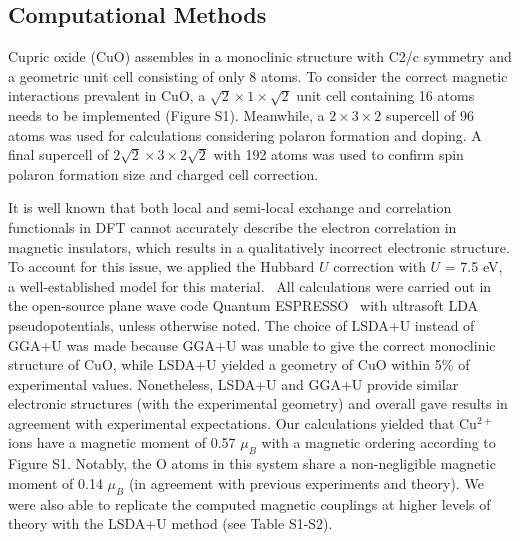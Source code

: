 \subsection{Computational Methods}
Cupric oxide (CuO) assembles in a monoclinic structure with C2/c symmetry and a geometric unit cell consisting of only 8 atoms. To consider the correct magnetic interactions prevalent in CuO, a $\sqrt{2}\times 1\times \sqrt{2}$ unit cell containing 16 atoms needs to be implemented (Figure S1).\cite{rocquefelte2012theoretical,yang1989magnetic,forsyth1988magnetism} Meanwhile, a $2\times 3\times 2$ supercell of 96 atoms was used for calculations considering polaron formation and doping. A final supercell of $2\sqrt{2}\times 3\times 2\sqrt{2}$ with 192 atoms was used to confirm spin polaron formation size and charged cell correction.

It is well known that both local and semi-local exchange and correlation functionals in DFT cannot accurately describe the electron correlation in magnetic insulators, which results in a qualitatively incorrect electronic structure. To account for this issue, we applied the Hubbard $U$ correction\cite{dudarev1998electron} with $U$ = 7.5 eV, a well-established model for this material.~\cite{peng2012density,peng2014ab,heinemann2013band,debbichi2012vibrational,wu2006lsda} All calculations were carried out in the open-source plane wave code Quantum ESPRESSO~\cite{QE1} with ultrasoft LDA pseudopotentials,\cite{gbrv} unless otherwise noted. The choice of LSDA+U instead of GGA+U was made because GGA+U was unable to give the correct monoclinic structure of CuO, while LSDA+U yielded a geometry of CuO within 5\% of experimental values. Nonetheless, LSDA+U and GGA+U provide similar electronic structures (with the experimental geometry) and overall gave results in agreement with experimental expectations.  Our calculations yielded that Cu$^{2+}$ ions have a magnetic moment of 0.57 $\mu_B$ with a magnetic ordering according to Figure S1. Notably, the O atoms in this system share a non-negligible magnetic moment of 0.14 $\mu_B$ (in agreement with previous experiments\cite{forsyth1988magnetism} and theory\cite{peng2012density}). We were also able to replicate the computed magnetic couplings at higher levels of theory with the LSDA+U method (see Table S1-S2).
